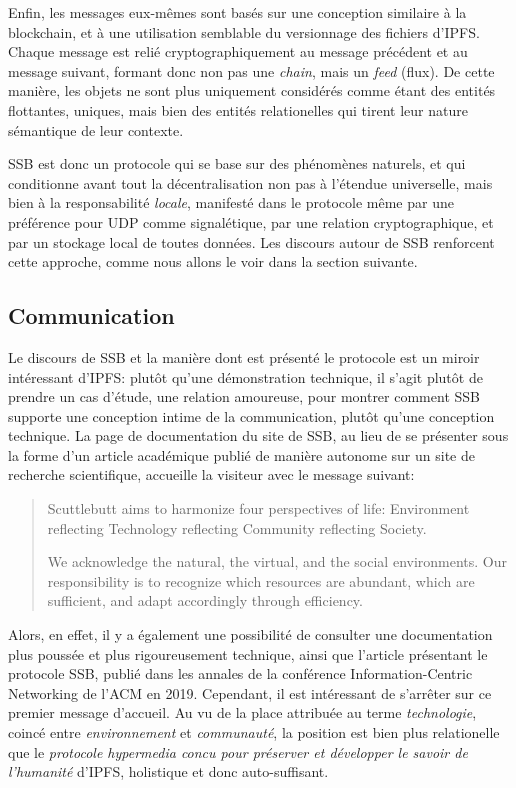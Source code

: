 \documentclass{article}
\begin{document}
Enfin, les messages eux-mêmes sont basés sur une conception similaire à la blockchain, et à une utilisation semblable du versionnage des fichiers d'IPFS. Chaque message est relié cryptographiquement au message précédent et au message suivant, formant donc non pas une \emph{chain}, mais un \emph{feed} (flux). De cette manière, les objets ne sont plus uniquement considérés comme étant des entités flottantes, uniques, mais bien des entités relationelles qui tirent leur nature sémantique de leur contexte.

SSB est donc un protocole qui se base sur des phénomènes naturels, et qui conditionne avant tout la décentralisation non pas à l'étendue universelle, mais bien à la responsabilité \emph{locale}, manifesté dans le protocole même par une préférence pour UDP comme signalétique, par une relation cryptographique, et par un stockage local de toutes données. Les discours autour de SSB renforcent cette approche, comme nous allons le voir dans la section suivante.

\subsection{Communication}

Le discours de SSB et la manière dont est présenté le protocole est un miroir intéressant d'IPFS: plutôt qu'une démonstration technique, il s'agit plutôt de prendre un cas d'étude, une relation amoureuse, pour montrer comment SSB supporte une conception intime de la communication, plutôt qu'une conception technique. La page de documentation du site de SSB, au lieu de se présenter sous la forme d'un article académique publié de manière autonome sur un site de recherche scientifique, accueille la visiteur avec le message suivant:

\begin{quote}
    Scuttlebutt aims to harmonize four perspectives of life: Environment reflecting Technology reflecting Community reflecting Society.

    We acknowledge the natural, the virtual, and the social environments. Our responsibility is to recognize which resources are abundant, which are sufficient, and adapt accordingly through efficiency.
\end{quote}

Alors, en effet, il y a également une possibilité de consulter une documentation plus poussée et plus rigoureusement technique, ainsi que l'article présentant le protocole SSB, publié dans les annales de la conférence Information-Centric Networking de l'ACM en 2019. Cependant, il est intéressant de s'arrêter sur ce premier message d'accueil. Au vu de la place attribuée au terme \emph{technologie}, coincé entre \emph{environnement} et \emph{communauté}, la position est bien plus relationelle que le \emph{protocole hypermedia concu pour préserver et développer le savoir de l'humanité} d'IPFS, holistique et donc auto-suffisant.
\end{document}
